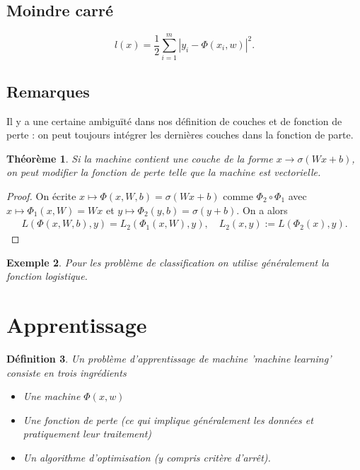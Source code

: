\documentclass[11pt,a4paper]{article}
\newcommand{\abs}[1]{\left|#1\right|}
\newtheorem{theorem}{Théorème}[section]
\newtheorem{definition}[theorem]{Définition}
\newtheorem{example}[theorem]{Exemple}
\begin{document}
\subsection{Moindre carré}\label{subsec:}
%
%
\begin{equation}\label{equation:}
l(x)= \frac12\sum_{i=1}^m \abs{y_i-\Phi(x_i,w)}^2.
\end{equation}
%
%
\subsection{Remarques}\label{subsec:}
%
Il y a une certaine ambiguïté dans nos définition de couches et de fonction de perte : on peut toujours intégrer les dernières couches dans la fonction de parte.
%
%
\begin{theorem}\label{theorem:}
Si la machine contient une couche de la forme $x\to \sigma(Wx+b)$, on peut modifier la fonction de perte telle que la machine est vectorielle.
\end{theorem}
%
%
\begin{proof}
On écrite $x\mapsto\Phi(x,W,b) = \sigma(Wx+b)$ comme $\Phi_2 \circ \Phi_1$ avec $x\mapsto \Phi_1(x,W) = Wx$ et $y\mapsto\Phi_2(y,b) = \sigma(y+b)$. On a alors
\begin{align*}
L(\Phi(x,W,b), y) = L_2(\Phi_1(x,W),y),\quad L_2 (x,y) := L(\Phi_2(x),y).
\end{align*}
\end{proof}
%
%
\begin{example}\label{example:}
Pour les problème de classification on utilise généralement la fonction logistique.
\end{example}
%
%
\section{Apprentissage}\label{sec:}
%
%
\begin{definition}\label{definition:}
Un problème d'apprentissage de machine 'machine learning' consiste en trois ingrédients
\begin{itemize}
\item Une machine $\Phi(x,w)$
\item Une fonction de perte (ce qui implique généralement les données et pratiquement leur traitement)
\item Un algorithme d'optimisation (y compris critère d'arrêt).
\end{itemize}
\end{definition}
%
%
\end{document}
